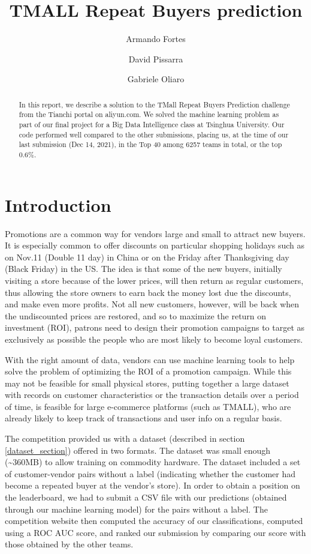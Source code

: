 \documentclass{article}
\title{TMALL Repeat Buyers prediction}
\author[1]{Armando Fortes}
\author[1]{David Pissarra}
\author[1]{Gabriele Oliaro}
\affil[1]{Department of Computer Science and Technology, Tsinghua University, Beijing, China \authorcr
  \{\tt ferreiracardos10, pissarrad10, oliarog10\}@mails.tsinghua.edu.cn}
\begin{document}
\maketitle

\begin{abstract}
  In this report, we describe a solution to the TMall Repeat Buyers Prediction challenge from the Tianchi portal on aliyun.com. We solved the machine learning problem as part of our final project for a Big Data Intelligence class at Tsinghua University. Our code performed well compared to the other submissions, placing us, at the time of our last submission (Dec 14, 2021), in the Top 40 among 6257 teams in total, or the top 0.6\%. 
\end{abstract}

\section{Introduction}
Promotions are a common way for vendors large and small to attract new buyers. It is especially common to offer discounts on particular shopping holidays such as on Nov.11 (Double 11 day) in China or on the Friday after Thanksgiving day (Black Friday) in the US. The idea is that some of the new buyers, initially visiting a store because of the lower prices, will then return as regular customers, thus allowing the store owners to earn back the money lost due the discounts, and make even more profits. Not all new customers, however, will be back when the undiscounted prices are restored, and so to maximize the return on investment (ROI), patrons need to design their promotion campaigns to target as exclusively as possible the people who are most likely to become loyal customers.

With the right amount of data, vendors can use machine learning tools to help solve the problem of optimizing the ROI of a promotion campaign. While this may not be feasible for small physical stores, putting together a large dataset with records on customer characteristics or the transaction details over a period of time, is feasible for large e-commerce platforms (such as TMALL), who are already likely to keep track of transactions and user info on a regular basis.

The competition \cite{tmall.com} provided us with a dataset (described in section \ref{dataset_section}) offered in two formats. The dataset was small enough (\textasciitilde 360MB) to allow training on commodity hardware. The dataset included a set of customer-vendor pairs without a label (indicating whether the customer had become a repeated buyer at the vendor's store). In order to obtain a position on the leaderboard, we had to submit a CSV file with our predictions (obtained through our machine learning model) for the pairs without a label. The competition website then computed the accuracy of our classifications, computed using a ROC AUC score, and ranked our submission by comparing our score with those obtained by the other teams.
\end{document}
